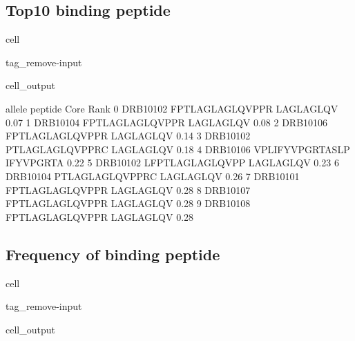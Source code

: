 \documentclass[letterpaper,10pt,english]{jupyterBook}
\begin{document}
\subsection{Top10 binding peptide}
\label{\detokenize{ipynb/chapter2:top10-binding-peptide}}
\begin{sphinxuseclass}{cell}
\begin{sphinxuseclass}{tag_remove-input}\begin{sphinxVerbatimOutput}

\begin{sphinxuseclass}{cell_output}
\begin{sphinxVerbatim}[commandchars=\\\{\}]
      allele          peptide       Core  Rank
0  DRB1\PYGZus{}0102  FPTLAGLAGLQVPPR  LAGLAGLQV  0.07
1  DRB1\PYGZus{}0104  FPTLAGLAGLQVPPR  LAGLAGLQV  0.08
2  DRB1\PYGZus{}0106  FPTLAGLAGLQVPPR  LAGLAGLQV  0.14
3  DRB1\PYGZus{}0102  PTLAGLAGLQVPPRC  LAGLAGLQV  0.18
4  DRB1\PYGZus{}0106  VPLIFYVPGRTASLP  IFYVPGRTA  0.22
5  DRB1\PYGZus{}0102  LFPTLAGLAGLQVPP  LAGLAGLQV  0.23
6  DRB1\PYGZus{}0104  PTLAGLAGLQVPPRC  LAGLAGLQV  0.26
7  DRB1\PYGZus{}0101  FPTLAGLAGLQVPPR  LAGLAGLQV  0.28
8  DRB1\PYGZus{}0107  FPTLAGLAGLQVPPR  LAGLAGLQV  0.28
9  DRB1\PYGZus{}0108  FPTLAGLAGLQVPPR  LAGLAGLQV  0.28
\end{sphinxVerbatim}

\end{sphinxuseclass}\end{sphinxVerbatimOutput}

\end{sphinxuseclass}
\end{sphinxuseclass}

\subsection{Frequency of binding peptide}
\label{\detokenize{ipynb/chapter2:id2}}
\begin{sphinxuseclass}{cell}
\begin{sphinxuseclass}{tag_remove-input}\begin{sphinxVerbatimOutput}

\begin{sphinxuseclass}{cell_output}
\noindent{}

\end{sphinxuseclass}\end{sphinxVerbatimOutput}

\end{sphinxuseclass}
\end{sphinxuseclass}
\end{document}
